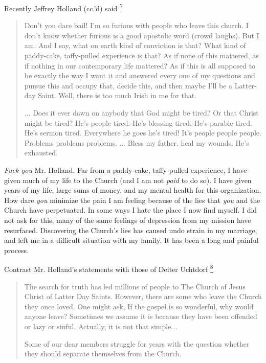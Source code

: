 \documentclass[a4paper]{article}
\providecommand*{\DUfootnotemark}[3]{%
  \raisebox{1em}{\hypertarget{#1}{}}%
  \hyperlink{#2}{\textsuperscript{#3}}%
}
\begin{document}
Recently Jeffrey Holland (cc.'d) said\DUfootnotemark{id10}{id18}{7}
%
\begin{quote}

Don't you dare bail!  I'm so furious with people who leave this church.  I don't know whether furious is a good apostolic word (crowd laughs).  But I am.  And I say, what on earth kind of conviction is that?  What kind of paddy-cake, taffy-pulled experience is that?  As if none of this mattered, as if nothing in our contemporary life mattered?  As if this is all supposed to be exactly the way I want it and answered every one of my questions and pursue this and occupy that, decide this, and then maybe I'll be a Latter-day Saint.  Well, there is too much Irish in me for that.

... Does it ever dawn on anybody that God might be tired?  Or that Christ might be tired?  He's people tired.  He's blessing tired.  He's parable tired.  He's sermon tired.  Everywhere he goes he's tired!  It's people people people.  Problems problems problems.  ... Bless my father, heal my wounds. He's exhausted.

\end{quote}

\emph{Fuck you} Mr. Holland.  Far from a \textquotedbl{}paddy-cake, taffy-pulled\textquotedbl{} experience, I have given much of my life to the Church (and I am not \emph{paid} to do so).  I have given years of my life, large sums of money, and my mental health for this organization.  How dare \emph{you} minimize the pain I am feeling because of the lies that \emph{you} and the Church have perpetuated.  In some ways I hate the place I now find myself.  I did not ask for this, many of the same feelings of depression from my mission have resurfaced.  Discovering the Church's lies has caused undo strain in my marriage, and left me in a difficult situation with my family.  It has been a long and painful process.

Contrast Mr. Holland's statements with those of Deiter Uchtdorf\DUfootnotemark{id11}{id19}{8}
%
\begin{quote}

The search for truth has led millions of people to The Church of Jesus Christ of Latter Day Saints.  However, there are some who leave the Church they once loved.  One might ask, \textquotedbl{}If the gospel is so wonderful, why would anyone leave?\textquotedbl{}  Sometimes we assume it is because they have been offended or lazy or sinful.  Actually, it is not that simple...

Some of our dear members struggle for years with the question whether they should separate themselves from the Church.

\end{quote}
\end{document}
